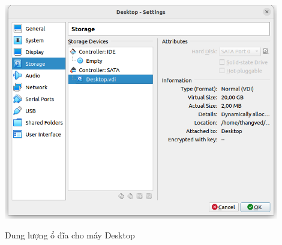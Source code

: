 \documentclass[a4paper, 11pt]{article}
\begin{document}
\begin{itemize}
\begin{enumerate}
                    \begin{minipage}
                        {\linewidth}
                        \captionsetup{type=figure}
                        \centering
                        \includegraphics[width=12cm]{images/desktop-disk.png}
                        \caption{Dung lượng ổ đĩa cho máy Desktop}
                        \label{figure:desktop-disk}
                    \end{minipage}


\end{enumerate}
\end{itemize}
\end{document}
